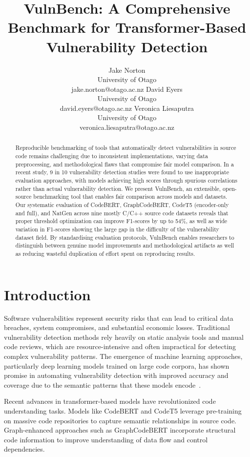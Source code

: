 \documentclass[letterpaper]{article}
\title{VulnBench: A Comprehensive Benchmark for Transformer-Based Vulnerability Detection}
\author{
Jake Norton\\
University of Otago\\
jake.norton@otago.ac.nz
\And
David Eyers\\
University of Otago\\
david.eyers@otago.ac.nz
\And
Veronica Liesaputra\\
University of Otago\\
veronica.liesaputra@otago.ac.nz
}
\begin{document}
\maketitle

\begin{abstract}
	Reproducible benchmarking of tools that automatically detect vulnerabilities in source code remains challenging due to inconsistent implementations, varying data preprocessing, and methodological flaws that compromise fair model comparison. In a recent study, 9 in 10 vulnerability detection studies were found to use inappropriate evaluation approaches, with models achieving high scores through spurious correlations rather than actual vulnerability detection. We present VulnBench, an extensible, open-source benchmarking tool that enables fair comparison across models and datasets. Our systematic evaluation of CodeBERT, GraphCodeBERT, CodeT5 (encoder-only and full), and NatGen across nine mostly C/C++ source code datasets reveals that proper threshold optimization can improve F1-scores by up to 54\%, as well as wide variation in F1-scores showing the large gap in the difficulty of the vulnerability dataset field. By standardising evaluation protocols, VulnBench enables researchers to distinguish between genuine model improvements and methodological artifacts as well as reducing wasteful duplication of effort spent on reproducing results.
\end{abstract}


\section{Introduction}

Software vulnerabilities represent security risks that can lead to critical data breaches, system compromises, and substantial economic losses. Traditional vulnerability detection methods rely heavily on static analysis tools and manual code reviews, which are resource-intensive and often impractical for detecting complex vulnerability patterns. The emergence of machine learning approaches, particularly deep learning models trained on large code corpora, has shown promise in automating vulnerability detection with improved accuracy and coverage due to the semantic patterns that these models encode~\citep{systematic2024survey}.

Recent advances in transformer-based models have revolutionized code understanding tasks. Models like CodeBERT \citep{feng2020codebert} and CodeT5 \citep{wang2021codet5} leverage pre-training on massive code repositories to capture semantic relationships in source code. Graph-enhanced approaches such as GraphCodeBERT \citep{guo2021graphcodebert} incorporate structural code information to improve understanding of data flow and control dependencies.
\end{document}
